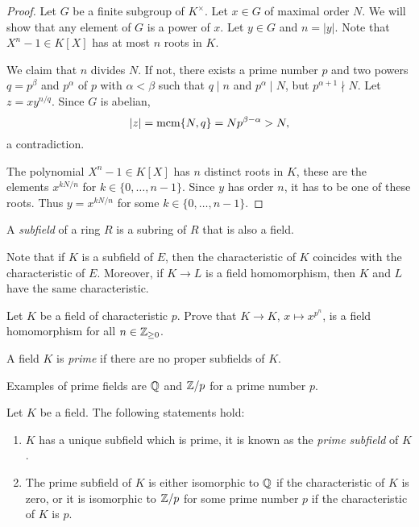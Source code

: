 \begin{proof}
    Let $G$ be a finite subgroup of $K^\times$. Let 
    $x\in G$ of maximal order $N$. We will show that any element of 
    $G$ is a power of $x$. Let $y\in G$ and $n=|y|$. 
    Note that $X^n-1\in K[X]$ has at most $n$ roots in $K$. 
    
    We claim that $n$ divides $N$. If not, there exists
    a prime number $p$ and 
    two powers $q=p^\beta$ and $p^\alpha$ of $p$
    with $\alpha<\beta$
    such that 
    $q\mid n$ and $p^\alpha\mid N$, but $p^{\alpha+1}\nmid N$.
    Let $z=xy^{n/q}$. Since 
    $G$ is abelian, 
    \[
    |z|=\mathrm{mcm}\{N,q\}=Np^{\beta-\alpha}>N,
    \]
    a contradiction. 

    The polynomial $X^n-1\in K[X]$ has $n$ distinct roots in $K$, these are
    the elements $x^{kN/n}$ for $k\in\{0,\dots,n-1\}$. Since $y$ 
    has order $n$, it has to be one of these roots. Thus
    $y=x^{kN/n}$ for some $k\in\{0,\dots,n-1\}$. 
\end{proof}

\begin{definition}
	A \emph{subfield} of a ring $R$ is a subring of $R$ 
	that is also a field.
\end{definition}

Note that if $K$ is a subfield of $E$, then
the characteristic of $K$ coincides
with the characteristic 
of $E$. Moreover, if $K\to L$ is a field homomorphism, then
$K$ and $L$ have the same characteristic. 

\begin{exercise}
\label{xca: Frobenius hom}
	Let $K$ be a field of characteristic $p$. Prove
	that $K\to K$, $x\mapsto x^{p^n}$, is a field homomorphism
	for all $n\in\mathbb{Z}_{\geq 0}$. 
\end{exercise}

\begin{definition}
	A field $K$ is \emph{prime} if there are no
	proper subfields of $K$. 
\end{definition}

Examples of prime fields are $\mathbb{Q}$ and $\mathbb{Z}/p$ for a prime number $p$.

\begin{proposition}
	Let $K$ be a field. The following statements hold:
	\begin{enumerate}
		\item $K$ has a unique subfield which is prime, it is known as the 
			\emph{prime subfield} of $K$.
		\item The prime subfield of $K$ is either isomorphic to $\mathbb{Q}$ if 
			the characteristic of $K$ is zero, or it is isomorphic to $\mathbb{Z}/p$ for
			some prime number $p$ if the characteristic of $K$ is $p$. 
	\end{enumerate}
\end{proposition}


